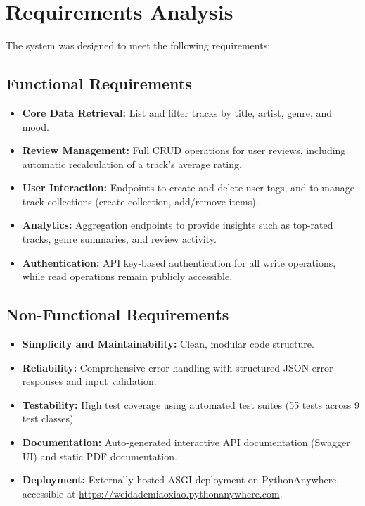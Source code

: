 \documentclass[11pt,a4paper]{article}
\begin{document}
\section{Requirements Analysis}

The system was designed to meet the following requirements:

\subsection{Functional Requirements}
\begin{itemize}[label=\textcolor{primary}{\textbullet}, noitemsep]
    \item \textbf{Core Data Retrieval:} List and filter tracks by title, artist, genre, and mood.
    \item \textbf{Review Management:} Full CRUD operations for user reviews, including automatic recalculation of a track's average rating.
    \item \textbf{User Interaction:} Endpoints to create and delete user tags, and to manage track collections (create collection, add/remove items).
    \item \textbf{Analytics:} Aggregation endpoints to provide insights such as top-rated tracks, genre summaries, and review activity.
    \item \textbf{Authentication:} API key-based authentication for all write operations, while read operations remain publicly accessible.
\end{itemize}

\subsection{Non-Functional Requirements}
\begin{itemize}[label=\textcolor{primary}{\textbullet}, noitemsep]
    \item \textbf{Simplicity and Maintainability:} Clean, modular code structure.
    \item \textbf{Reliability:} Comprehensive error handling with structured JSON error responses and input validation.
    \item \textbf{Testability:} High test coverage using automated test suites (55 tests across 9 test classes).
    \item \textbf{Documentation:} Auto-generated interactive API documentation (Swagger UI) and static PDF documentation.
    \item \textbf{Deployment:} Externally hosted ASGI deployment on PythonAnywhere, accessible at \url{https://weidademiaoxiao.pythonanywhere.com}.
\end{itemize}
\end{document}
